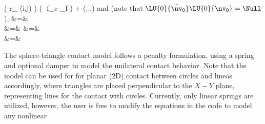     \left(-r_ {(i,j)} \cdot {} \right) \left( -f_c \cdot \delta_f  \right) +  (...)
\eea
and (note that $\LU{0}{\tilde \nv_0} \LU{0}{\nv_0} = \Null$),
\bea
   &=& \nonumber\\
   &=&
\eea
\bea
   &=& \nonumber\\
   &=&
\eea







%
%
The sphere-triangle contact model follows a penalty formulation, using a spring and optional damper to model the unilateral contact behavior. Note that the model can be used for for planar (2D) contact between circles and lineas accordingly, where triangles are placed perpendicular to the $X-Y$ plane, representing lines for the contact with circles.
Currently, only linear springs are utilized, however, the user is free to modify the equations in the code to model any nonlinear 

